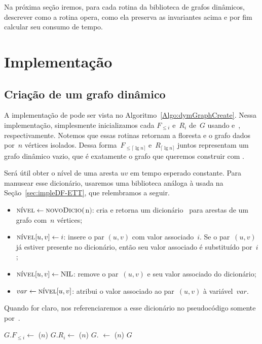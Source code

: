 Na próxima seção iremos, para cada rotina da biblioteca de grafos dinâmicos, descrever como a rotina opera, como ela preserva as invariantes acima e por fim calcular seu consumo de tempo.

\section{Implementação}
\subsection{Criação de um grafo dinâmico}

A implementação de \dymGraphCreate{} pode ser vista no Algoritmo~\ref{Algo:dymGraphCreate}. Nessa implementação, simplesmente inicializamos cada $F_{\leqslant i}$ e~$R_i$ de~$G$ usando \dymForestCreate{} e~\graphCreate{}, respectivamente. Notemos que essas rotinas retornam a floresta e o grafo dados por~$n$ vértices isolados. Dessa forma~$F_{\leqslant \lceil \lg n \rceil}$ e~$R_{\lceil \lg n \rceil}$ juntos representam um grafo dinâmico vazio, que é exatamente o grafo que queremos construir com \dymGraphCreate{}.

Será útil obter o nível de uma aresta $uv$ em tempo esperado constante.
Para manusear esse dicionário, usaremos uma biblioteca análoga à usada na Seção~\ref{sec:impleDF-ETT}, que relembramos a seguir.

\begin{itemize}
    \item $\nivel \gets \hashCreate($n$)$: cria e retorna um dicionário~\nivel{} para arestas de um grafo com~$n$ vértices;
    \item $\nivel[u,v] \gets i$: insere o par $(u,v)$ com valor associado~$i$. Se o par~$(u,v)$ já estiver presente no dicionário, então seu valor associado é substituído por~$i$;
    \item $\nivel[u,v] \gets \Nil$: remove o par~$(u,v)$ e seu valor associado do dicionário;
    \item $var \gets \nivel[u,v]$: atribui o valor associado ao par~$(u,v)$ à variável~$var$.
\end{itemize}

Quando for claro, nos referenciaremos a esse dicionário no pseudocódigo somente por~\nivel.

\begin{algorithm}
\caption{\dymGraphCreate($n$)}
\label{Algo:dymGraphCreate}
\begin{algorithmic}[1]
\State $G.F_{\leqslant i} \gets$ \dymForestCreate($n$)
\State $G.R_i \gets$ \graphCreate($n$)
\EndFor
\State $G$.\nivel{} $\gets$ \hashCreate($n$)
\State \Return $G$ 
\end{algorithmic}
\end{algorithm}

